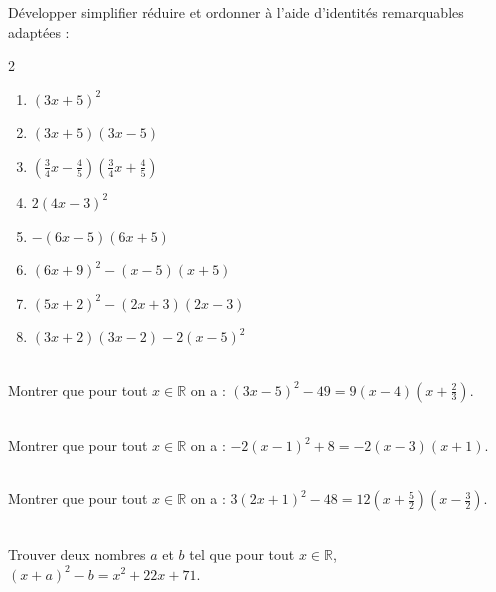 \documentclass[main.tex]{subfiles}
\begin{document}
\vspace{-1.5em}
\begin{exercise} \label{chap07:exo:ir} Développer simplifier réduire et ordonner à l'aide d'identités remarquables adaptées :
	\vspace{-0.5em}
	\begin{multicols}{2}
		\begin{enumerate}[label={$\Alph*=$},leftmargin=*]
			\item $(3x+5)^2 $    
			\item $(3x+5)(3x-5) $    
			\item $\left(\frac{3}{4} x-\frac{4}{5}\right)\left(\frac{3}{4}x+\frac{4}{5}\right) $    
			\item $2(4x-3)^2$  
			\item $-(6x-5)(6x+5)$
			\item  $(6x+9)^2-(x-5)(x+5)$ 
			\item $(5x+2)^2-(2x+3)(2x-3)$
			\item  $(3x+2)(3x-2)- 2(x-5)^2$     
		\end{enumerate}
	\end{multicols} 
\end{exercise} 
\begin{exercise}\hfill \\
	 Montrer que pour tout $x\in\mathbb{R}$ on a :  $(3x -5)^2 -49=9(x-4)\left(x+\frac{2}{3}\right)$.
\end{exercise}
\begin{exercise}\hfill \\
	 Montrer que pour tout $x\in\mathbb{R}$ on a :  $−2(x − 1)^2 + 8 =-2(x-3)(x+1)$.
\end{exercise}
\begin{exercise} \hfill \\
	Montrer que pour tout $x\in\mathbb{R}$ on a :  $3(2x +1)^2 -48 = 12\left(x+\frac{5}{2}\right)\left(x-\frac{3}{2}\right)$.
\end{exercise} 
\begin{exercise} \hfill \\ 
	Trouver deux nombres $a$ et $b$ tel que pour tout $x\in\mathbb{R}$, $(x+a)^2-b=x^2+22x+71$.
\end{exercise}
\end{document}
